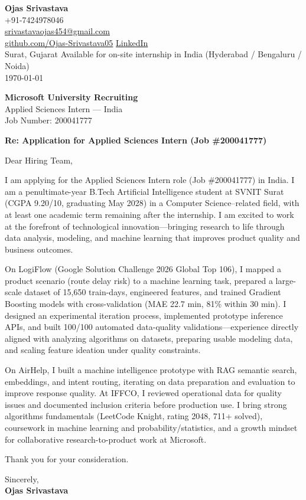 \documentclass[a4paper,11pt]{article}
\begin{document}
\begin{flushright}
\textbf{Ojas Srivastava} \\
+91-7424978046 \\
\href{mailto:srivastavaojas454@gmail.com}{srivastavaojas454@gmail.com} \\
\href{https://github.com/Ojas-Srivastava05}{github.com/Ojas-Srivastava05} \textbar{}
\href{https://linkedin.com/in/ojas-srivastava05}{LinkedIn} \\
Surat, Gujarat \textbar{} Available for on-site internship in India (Hyderabad / Bengaluru / Noida) \\
\today
\end{flushright}

\vspace{4mm}
\textbf{Microsoft University Recruiting} \\
Applied Sciences Intern --- India \\
Job Number: 200041777

\vspace{2mm}
\textbf{Re: Application for Applied Sciences Intern (Job \#200041777)}

Dear Hiring Team,

I am applying for the Applied Sciences Intern role (Job \#200041777) in India. I am a penultimate-year B.Tech Artificial Intelligence student at SVNIT Surat (CGPA 9.20/10, graduating May 2028) in a Computer Science--related field, with at least one academic term remaining after the internship. I am excited to work at the forefront of technological innovation---bringing research to life through data analysis, modeling, and machine learning that improves product quality and business outcomes.

On LogiFlow (Google Solution Challenge 2026 Global Top 106), I mapped a product scenario (route delay risk) to a machine learning task, prepared a large-scale dataset of 15,650 train-days, engineered features, and trained Gradient Boosting models with cross-validation (MAE 22.7 min, 81\% within 30 min). I designed an experimental iteration process, implemented prototype inference APIs, and built 100/100 automated data-quality validations---experience directly aligned with analyzing algorithms on datasets, preparing usable modeling data, and scaling feature ideation under quality constraints.

On AirHelp, I built a machine intelligence prototype with RAG semantic search, embeddings, and intent routing, iterating on data preparation and evaluation to improve response quality. At IFFCO, I reviewed operational data for quality issues and documented inclusion criteria before production use. I bring strong algorithms fundamentals (LeetCode Knight, rating 2048, 711+ solved), coursework in machine learning and probability/statistics, and a growth mindset for collaborative research-to-product work at Microsoft.

Thank you for your consideration.

Sincerely, \\
\vspace{8mm}
\textbf{Ojas Srivastava}
\end{document}
